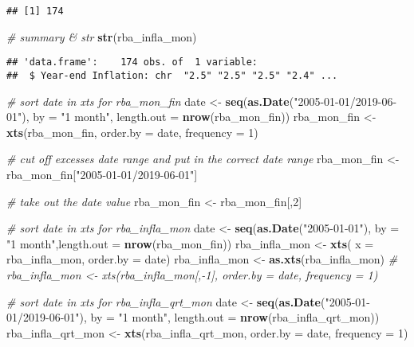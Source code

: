 \documentclass[]{article}
\newenvironment{Shaded}{\begin{snugshade}}{\end{snugshade}}
\newcommand{\KeywordTok}[1]{\textcolor[rgb]{0.13,0.29,0.53}{\textbf{#1}}}
\newcommand{\DataTypeTok}[1]{\textcolor[rgb]{0.13,0.29,0.53}{#1}}
\newcommand{\DecValTok}[1]{\textcolor[rgb]{0.00,0.00,0.81}{#1}}
\newcommand{\StringTok}[1]{\textcolor[rgb]{0.31,0.60,0.02}{#1}}
\newcommand{\CommentTok}[1]{\textcolor[rgb]{0.56,0.35,0.01}{\textit{#1}}}
\newcommand{\NormalTok}[1]{#1}
\begin{document}
\begin{verbatim}
## [1] 174
\end{verbatim}

\begin{Shaded}
\begin{Highlighting}[]
    \CommentTok{# summary & str}
    \KeywordTok{str}\NormalTok{(rba_infla_mon)}
\end{Highlighting}
\end{Shaded}

\begin{verbatim}
## 'data.frame':    174 obs. of  1 variable:
##  $ Year-end Inflation: chr  "2.5" "2.5" "2.5" "2.4" ...
\end{verbatim}

\begin{Shaded}
\begin{Highlighting}[]
    \CommentTok{# sort date in xts for rba_mon_fin}
\NormalTok{    date <-}\StringTok{ }\KeywordTok{seq}\NormalTok{(}\KeywordTok{as.Date}\NormalTok{(}\StringTok{"2005-01-01/2019-06-01"}\NormalTok{), }\DataTypeTok{by =} \StringTok{"1 month"}\NormalTok{, }
                \DataTypeTok{length.out =} \KeywordTok{nrow}\NormalTok{(rba_mon_fin))}
\NormalTok{    rba_mon_fin <-}\StringTok{ }\KeywordTok{xts}\NormalTok{(rba_mon_fin, }\DataTypeTok{order.by =}\NormalTok{ date, }\DataTypeTok{frequency =} \DecValTok{1}\NormalTok{) }
    
    \CommentTok{# cut off excesses date range and put in the correct date range}
\NormalTok{    rba_mon_fin <-}\StringTok{ }\NormalTok{rba_mon_fin[}\StringTok{"2005-01-01/2019-06-01"}\NormalTok{]}
    
    \CommentTok{# take out the date value}
\NormalTok{    rba_mon_fin <-}\StringTok{ }\NormalTok{rba_mon_fin[,}\DecValTok{2}\NormalTok{]}
    
    \CommentTok{# sort date in xts for rba_infla_mon}
\NormalTok{    date <-}\StringTok{ }\KeywordTok{seq}\NormalTok{(}\KeywordTok{as.Date}\NormalTok{(}\StringTok{"2005-01-01"}\NormalTok{), }\DataTypeTok{by =} \StringTok{"1 month"}\NormalTok{,}\DataTypeTok{length.out =} \KeywordTok{nrow}\NormalTok{(rba_mon_fin))}
\NormalTok{    rba_infla_mon <-}\StringTok{ }\KeywordTok{xts}\NormalTok{( }\DataTypeTok{x =}\NormalTok{ rba_infla_mon, }\DataTypeTok{order.by =}\NormalTok{ date)}
\NormalTok{    rba_infla_mon <-}\StringTok{ }\KeywordTok{as.xts}\NormalTok{(rba_infla_mon)}
    \CommentTok{# rba_infla_mon <- xts(rba_infla_mon[,-1], order.by = date, frequency = 1) }
    
    \CommentTok{# sort date in xts for rba_infla_qrt_mon}
\NormalTok{    date <-}\StringTok{ }\KeywordTok{seq}\NormalTok{(}\KeywordTok{as.Date}\NormalTok{(}\StringTok{"2005-01-01/2019-06-01"}\NormalTok{), }\DataTypeTok{by =} \StringTok{"1 month"}\NormalTok{, }
                \DataTypeTok{length.out =} \KeywordTok{nrow}\NormalTok{(rba_infla_qrt_mon))}
\NormalTok{    rba_infla_qrt_mon <-}\StringTok{ }\KeywordTok{xts}\NormalTok{(rba_infla_qrt_mon, }\DataTypeTok{order.by =}\NormalTok{ date, }\DataTypeTok{frequency =} \DecValTok{1}\NormalTok{) }
    

\end{Highlighting}
\end{Shaded}
\end{document}
